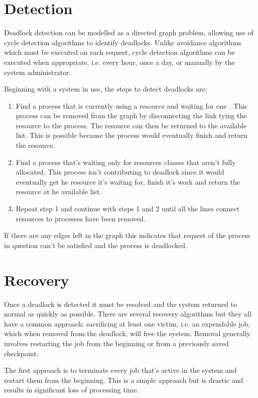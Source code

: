 \documentclass[12pt letter]{report}
\begin{document}
\section{Detection}

Deadlock detection can be modelled as a directed graph problem,
allowing use of cycle detection algorithms to identify deadlocks.
Unlike avoidance algorithms which must be executed on each request,
cycle detection algorithms can be executed when appropriate, i.e.
every hour, once a day, or manually by the system administrator.

Beginning with a system in use, the steps to detect deadlocks are:
\begin{enumerate}
  \item Find a process that is currently using a resource and waiting
    for one . This process can be removed from the graph by
    disconnecting the link tying the resource to the process. The
    resource can then be returned to the available list. This is
    possible because the process would eventually finish and return
    the resource.
  \item Find a process that's waiting only for resources classes that
    aren't fully allocated. This process isn't contributing to
    deadlock since it would eventually get he resource it's waiting
    for, finish it's work and return the resource at he available list.
  \item Repeat step 1 and continue with steps 1 and 2 until all the
    lines connect resources to processes have been removed.
\end{enumerate}

If there are any edges left in the graph this indicates that request
of the process in question can't be satisfied and the process is deadlocked.

\section{Recovery}

Once a deadlock is detected it must be resolved and the system
returned to normal as quickly as possible. There are several recovery
algorithms but they all have a common approach: sacrificing at least
one victim, i.e. an expendable job, which when removed from the
deadlock, will free the system. Removal generally involves restarting
the job from the beginning or from a previously saved checkpoint.

The first approach is to terminate every job that's active in the
system and restart them from the beginning. This is a simple approach
but is drastic and results in significant loss of processing time.
\end{document}
